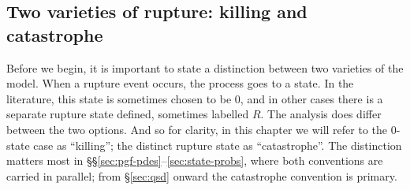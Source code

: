 \subsection{Two varieties of rupture: killing and catastrophe}
\label{sec:rupture-conventions}

Before we begin, it is important to state a distinction between two
varieties of the model. When a rupture event occurs, the process goes to a
state. In the literature, this state is sometimes chosen to be $0$, and in
other cases there is a separate rupture state defined, sometimes labelled
$R$. The analysis does differ between the two options. And so for clarity,
in this chapter we will refer to the $0$-state case as ``killing''; the
distinct rupture state as ``catastrophe''. The distinction matters most in
\S\S\ref{sec:pgf-pdes}--\ref{sec:state-probs}, where both conventions are
carried in parallel; from \S\ref{sec:qsd} onward the catastrophe
convention is primary.
